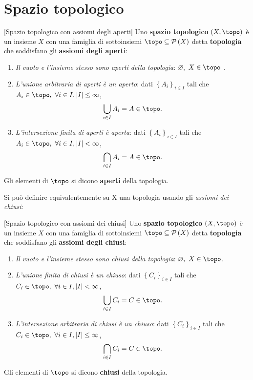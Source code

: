 \section{Spazio topologico}
\begin{definition}{}[Spazio topologico con assiomi degli aperti]
	Uno \textbf{spazio topologico} $\left(X, \topo\right)$ è un insieme $X$ con una famiglia di sottoinsiemi $\topo\subseteq\powerset{X}$ detta \textbf{topologia} che soddisfano gli \textbf{assiomi degli aperti}:
	\begin{enumerate}
		\item \textit{Il vuoto e l'insieme stesso sono aperti della topologia}: $\emptyset,\ X\in\topo$ .
		\item \textit{L'unione arbitraria di aperti è un aperto}: dati $\left\{A_i\right\}_{i\in I}$ tali che $A_i\in\topo,\ \forall i\in I,\left| I\right|\leq \infty$,
		\begin{equation*}
			\bigcup_{i\in I}A_i=A\in\topo.
		\end{equation*}
		\item \textit{L'intersezione finita di aperti è aperta}: dati $\left\{A_i\right\}_{i\in I}$ tali che $A_i\in\topo,\ \forall i\in I,\left|I\right|< \infty$,
		\begin{equation*}
			\bigcap_{i\in I}A_i=A\in\topo.
		\end{equation*}
	\end{enumerate}
	Gli elementi di $\topo$ si dicono \textbf{aperti} della topologia.
\end{definition}%
 Si può definire equivalentemente su X una topologia usando gli \textit{assiomi dei chiusi}:
\begin{definition}{}[Spazio topologico con assiomi dei chiusi]
Uno \textbf{spazio topologico} $\left(X, \topo\right)$ è un insieme $X$ con una famiglia di sottoinsiemi $\topo\subseteq\powerset{X}$ detta \textbf{topologia} che soddisfano gli \textbf{assiomi degli chiusi}:
	\begin{enumerate}
		\item \textit{Il vuoto e l'insieme stesso sono chiusi della topologia}: $\emptyset,\ X\in\topo$.
		\item \textit{L'unione finita di chiusi è un chiuso}: dati $\left\{C_i\right\}_{i\in I}$ tali che $C_i\in\topo,\ \forall i\in I,\left|I\right|< \infty$,
		\begin{equation*}
			\bigcup_{i\in I}C_i=C\in\topo.
		\end{equation*}
		\item \textit{L'intersezione arbitraria di chiusi è un chiuso}: dati $\left\{C_i\right\}_{i\in I}$ tali che $C_i\in\topo,\ \forall i\in I,\left|I\right|\leq \infty$,
		\begin{equation*}
			 \bigcap_{i\in I}C_i=C\in\topo.
		\end{equation*}
	\end{enumerate}
	Gli elementi di $\topo$ si dicono \textbf{chiusi} della topologia.
\end{definition}

